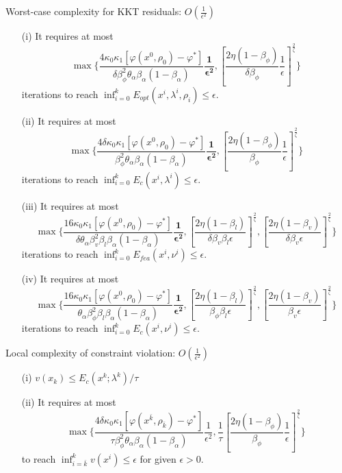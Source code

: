 \documentclass[8pt]{beamer}
\begin{document}
	\begin{frame}{Worst-case complexity for KKT residuals: $O(\frac{1}{\epsilon^2})$}
	\begin{enumerate}
		\item[(i)]  It requires at most 
		\[ \max\Big\{\frac{ 4\kappa_0\kappa_1 [\varphi(x^0,\rho_0) - \varphi^* ]}{\delta \beta_\phi^2   \theta_\alpha \beta_\alpha (1-\beta_\alpha)} \mathbf{\frac{1}{\epsilon^2}},[\frac{2\eta(1-\beta_\phi)}{\delta\beta_\phi } \frac{1}{\epsilon} ]^{\frac{2}{\zeta}}\Big\} \] 
		iterations to reach $\inf_{i=0}^k E_{opt}(x^i, \lambda^i,\rho_i)   \le \epsilon$.
		\item[(ii)] It requires at most
		  \[ \max\Big\{\frac{ 4 \delta \kappa_0\kappa_1 [\varphi(x^0,\rho_0) - \varphi^* ]}{ \beta_\phi^2   \theta_\alpha \beta_\alpha (1-\beta_\alpha)} \mathbf{\frac{1}{\epsilon^2}}, [\frac{2\eta(1-\beta_\phi)}{ \beta_\phi } \frac{1}{\epsilon}]^{\frac{2}{\zeta}}\Big\}  \] 
		iterations to reach $\inf_{i=0}^k E_{c}(x^i, \lambda^i)   \le \epsilon$.
		\item[(iii)]  It requires at most 
		\[ \max\Big\{\frac{16 \kappa_0\kappa_1[\varphi(x^0,\rho_0) - \varphi^* ]}{\delta \theta_\alpha \beta_v^2  \beta_l \beta_\alpha(1-\beta_\alpha)} \mathbf{\frac{1}{\epsilon^2}}, \left[ \frac{2\eta(1-\beta_l)}{\delta \beta_v \beta_l \epsilon}\right]^{\frac{2}{\zeta}}, \left[\frac{2\eta(1-\beta_v)}{\delta\beta_v \epsilon} \right] ^{\frac{2}{\zeta}} \Big\}\] 
		iterations to reach $\inf_{i=0}^k E_{fea}(x^i, \nu^i)   \le \epsilon$.
		\item[(iv)]  It requires at most
		\[ \max\Big\{\frac{16 \kappa_0\kappa_1[\varphi(x^0,\rho_0) - \varphi^* ]}{ \theta_\alpha \beta_\phi^2  \beta_l \beta_\alpha(1-\beta_\alpha)} \mathbf{\frac{1}{\epsilon^2}}, \left[ \frac{2\eta(1-\beta_l)}{ \beta_\phi \beta_l \epsilon}\right]^{\frac{2}{\zeta}},  \left[\frac{2\eta(1-\beta_v)}{ \beta_v\epsilon} \right] ^{\frac{2}{\zeta}} \Big\}\] 
		iterations to reach $\inf_{i=0}^k E_{c}(x^i, \nu^i)  \le \epsilon$.
	\end{enumerate}\end{frame}
	
	\begin{frame}{Local complexity of constraint violation: $O(\frac{1}{\epsilon^2})$}
	\begin{enumerate}
		\item[(i)]  
			$ v(x_k) \le E_c(x^k; \lambda^k ) / \tau$
		\vfill
		\item[(ii)] It requires at most
			\[ \max\Big\{ \frac{ 4 \delta \kappa_0\kappa_1 [\varphi(x^{\bar{k}},\rho_{\bar{k}}) - \varphi^* ]}{ \tau \beta_\phi^2   \theta_\alpha \beta_\alpha (1-\beta_\alpha)} \frac{1}{\epsilon^2}, \frac{1}{\tau}[\frac{2\eta(1-\beta_\phi)}{ \beta_\phi } \frac{1}{\epsilon}]^{\frac{2}{\zeta}} \Big\} \] 
			to reach $\inf_{i = \bar{k}}^kv(x^i)\le \epsilon$ for given $\epsilon > 0$. 
	\end{enumerate}\end{frame}
\end{document}
